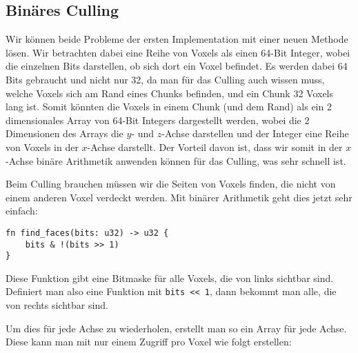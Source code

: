 \subsection{Binäres Culling}

Wir können beide Probleme der ersten Implementation
mit einer neuen Methode lösen.
Wir betrachten dabei eine Reihe von Voxels als einen
64-Bit Integer, wobei die einzelnen Bits darstellen,
ob sich dort ein Voxel befindet.
Es werden dabei 64 Bits gebraucht und nicht nur 32,
da man für das Culling auch wissen muss,
welche Voxels sich am Rand eines Chunks befinden,
und ein Chunk 32 Voxels lang ist.
Somit könnten die Voxels in einem Chunk
(und dem Rand) als ein 2 dimensionales
Array von 64-Bit Integers dargestellt werden,
wobei die 2 Dimensionen des Arrays die
$y$- und $z$-Achse darstellen und der Integer eine
Reihe von Voxels in der $x$-Achse darstellt.
Der Vorteil davon ist, dass wir somit in der
$x$-Achse binäre Arithmetik anwenden können für
das Culling, was sehr schnell ist.

Beim Culling brauchen müssen wir die Seiten von
Voxels finden, die nicht von einem anderen Voxel
verdeckt werden.
Mit binärer Arithmetik geht dies jetzt sehr einfach:
\begin{verbatim}
fn find_faces(bits: u32) -> u32 {
    bits & !(bits >> 1)
}
\end{verbatim}
Diese Funktion gibt eine Bitmaske für alle Voxels,
die von links sichtbar sind.
Definiert man also eine Funktion mit \verb|bits << 1|,
dann bekommt man alle, die von rechts sichtbar sind.

Um dies für jede Achse zu wiederholen,
erstellt man so ein Array für jede Achse.
Diese kann man mit nur einem Zugriff pro Voxel
wie folgt erstellen:



